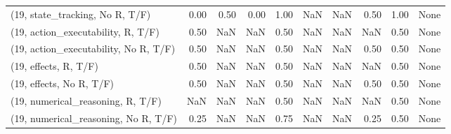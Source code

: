 \begin{table*}[h!]
\begin{adjustbox}{width=2\columnwidth,center}
\begin{tabular}{lrrr|rrr|rrr}
(19, state\_tracking, No R, T/F)       &                      0.00 &                  0.50 &                      0.00 &                          1.00 &                       NaN &                           NaN &                                   0.50 &                               1.00 &                                  None \\
(19, action\_executability, R, T/F)    &                      0.50 &                   NaN &                       NaN &                          0.50 &                       NaN &                           NaN &                                    NaN &                               0.50 &                                  None \\
(19, action\_executability, No R, T/F) &                      0.50 &                   NaN &                       NaN &                          0.50 &                       NaN &                           NaN &                                   0.50 &                               0.50 &                                  None \\
(19, effects, R, T/F)                 &                      0.50 &                   NaN &                       NaN &                          0.50 &                       NaN &                           NaN &                                    NaN &                               0.50 &                                  None \\
(19, effects, No R, T/F)              &                      0.50 &                   NaN &                       NaN &                          0.50 &                       NaN &                           NaN &                                   0.50 &                               0.50 &                                  None \\
(19, numerical\_reasoning, R, T/F)     &                       NaN &                   NaN &                       NaN &                          0.50 &                       NaN &                           NaN &                                    NaN &                               0.50 &                                  None \\
(19, numerical\_reasoning, No R, T/F)  &                      0.25 &                   NaN &                       NaN &                          0.75 &                       NaN &                           NaN &                                   0.25 &                               0.50 &                                  None \\

\end{tabular}
\end{adjustbox}
\end{table*}
